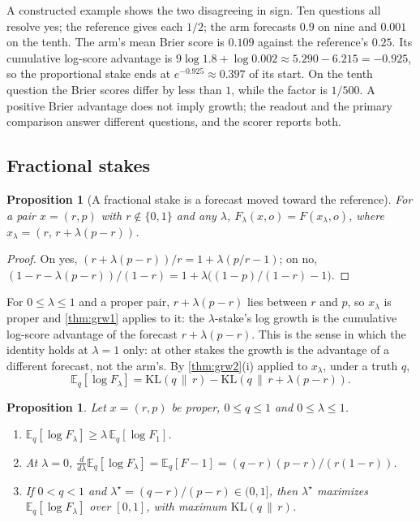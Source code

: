 \documentclass[11pt]{article}
\theoremstyle{plain}
\newtheorem{proposition}[theorem]{Proposition}
\theoremstyle{definition}
\theoremstyle{remark}
\newcommand{\KL}[2]{\mathrm{KL}(#1\,\|\,#2)}
\newcommand{\E}{\mathbb{E}}
\begin{document}
A constructed example shows the two disagreeing in sign. Ten questions all resolve yes; the
reference gives each $1/2$; the arm forecasts $0.9$ on nine and $0.001$ on the tenth. The arm's
mean Brier score is $0.109$ against the reference's $0.25$. Its cumulative log-score advantage is
$9\log1.8+\log0.002\approx5.290-6.215=-0.925$, so the proportional stake ends at
$e^{-0.925}\approx0.397$ of its start. On the tenth question the Brier scores differ by less than
$1$, while the factor is $1/500$. A positive Brier advantage does not imply growth; the readout and
the primary comparison answer different questions, and the scorer reports both.

\subsection{Fractional stakes}

\begin{proposition}[A fractional stake is a forecast moved toward the reference]
\label{prop:shrink}
For a pair $x=(r,p)$ with $r\notin\{0,1\}$ and any $\lambda$, $F_\lambda(x,o)=F(x_\lambda,o)$, where
$x_\lambda=(r,\,r+\lambda(p-r))$.
\end{proposition}

\begin{proof}
On yes, $(r+\lambda(p-r))/r=1+\lambda(p/r-1)$; on no,
$(1-r-\lambda(p-r))/(1-r)=1+\lambda\bigl((1-p)/(1-r)-1\bigr)$.
\end{proof}

For $0\le\lambda\le1$ and a proper pair, $r+\lambda(p-r)$ lies between $r$ and $p$, so $x_\lambda$
is proper and \cref{thm:grw1} applies to it: the $\lambda$-stake's log growth is the cumulative
log-score advantage of the forecast $r+\lambda(p-r)$. This is the sense in which the identity holds
at $\lambda=1$ only: at other stakes the growth is the advantage of a different forecast, not the
arm's. By \cref{thm:grw2}(i) applied to $x_\lambda$, under a truth $q$,
\begin{equation}
  \label{eq:fractional}
  \E_q[\log F_\lambda]=\KL{q}{r}-\KL{q}{r+\lambda(p-r)}.
\end{equation}

\begin{proposition}
\label{prop:fraction}
Let $x=(r,p)$ be proper, $0\le q\le1$ and $0\le\lambda\le1$.
\begin{enumerate}
  \item[(i)] $\E_q[\log F_\lambda]\ge\lambda\,\E_q[\log F_1]$.
  \item[(ii)] At $\lambda=0$, $\frac{d}{d\lambda}\E_q[\log F_\lambda]=\E_q[F-1]
    =(q-r)(p-r)/(r(1-r))$.
  \item[(iii)] If $0<q<1$ and $\lambda^\star=(q-r)/(p-r)\in(0,1]$, then $\lambda^\star$ maximizes
    $\E_q[\log F_\lambda]$ over $[0,1]$, with maximum $\KL{q}{r}$.
\end{enumerate}
\end{proposition}
\end{document}
